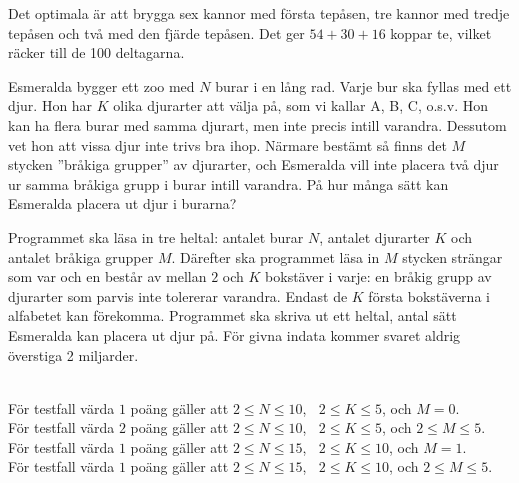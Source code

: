  Det optimala är att brygga sex kannor med första tepåsen,
tre kannor med tredje tepåsen och två med den fjärde tepåsen.
Det ger $54+30+16$ koppar te, vilket räcker till de 100  deltagarna.


\newpage
{}

Esmeralda bygger ett zoo med $N$ burar i en lång rad. Varje bur ska fyllas med ett djur. Hon har $K$ olika djurarter att välja på, som vi kallar A, B, C, o.s.v. Hon kan ha flera burar med samma djurart, men inte precis intill varandra. Dessutom vet hon att vissa djur inte trivs bra ihop. Närmare bestämt så finns det $M$ stycken ''bråkiga grupper'' av djurarter, och Esmeralda vill inte placera två djur ur samma bråkiga grupp i burar intill varandra. På hur många sätt kan Esmeralda placera ut djur i burarna?

Programmet ska läsa in tre heltal: antalet burar $N$, antalet djurarter $K$ och antalet bråkiga grupper $M$. Därefter ska programmet läsa in $M$ stycken strängar som var och en består av mellan $2$ och $K$ bokstäver i varje: en bråkig grupp av djurarter som parvis inte tolererar varandra. Endast de $K$ första bokstäverna i alfabetet kan förekomma. Programmet ska skriva ut ett heltal, antal sätt Esmeralda kan placera ut djur på. För givna indata kommer svaret aldrig överstiga 2 miljarder.

\\
För testfall värda $1$ poäng gäller att $2\le N \le 10$, $\;\;2\le K \le 5$, och $M=0$. \\
För testfall värda $2$ poäng gäller att $2\le N \le 10$, $\;\;2\le K \le 5$, och $2 \le M\le 5$. \\
För testfall värda $1$ poäng gäller att $2\le N \le 15$, $\;\;2\le K \le 10$, och $M=1$. \\
För testfall värda $1$ poäng gäller att $2\le N \le 15$, $\;\;2\le K \le 10$, och $2 \le M\le 5$. \\


